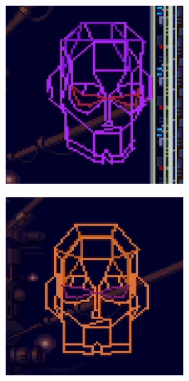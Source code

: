\begin{figure}[htp]
\begin{subfigure}{0.3\linewidth}
	\end{subfigure}
	\begin{subfigure}{0.3\linewidth}
		\centering
		\includegraphics[width=\linewidth]{figures/X2/Hunter_stages/Sigma_virus_phase_4.png}
	\end{subfigure}
	\vspace{2pt}
	\begin{subfigure}{0.3\linewidth}	
		\centering
		\includegraphics[width=\linewidth]{figures/X2/Hunter_stages/Sigma_virus_phase_5.png}

\end{subfigure}
\end{figure}
